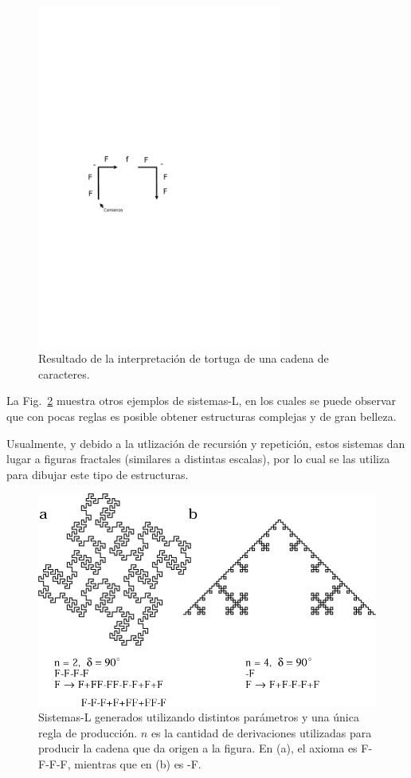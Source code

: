 \begin{figure}
\center
\includegraphics[width=8cm]{figures/tortuga}
\caption{Resultado de la interpretación de tortuga de una cadena de caracteres.}
\label{fg:tortuga}
\end{figure}

La Fig.~\ref{fg:sistemasL} muestra otros ejemplos de sistemas-L, en los cuales se puede observar que con pocas reglas es posible obtener estructuras complejas y de gran belleza.

Usualmente, y debido a la utlización de recursión y repetición, estos sistemas dan lugar a figuras fractales (similares a distintas escalas), por lo cual se las utiliza para dibujar este tipo de estructuras.

\begin{figure}
\center
\includegraphics[width=13cm]{figures/sistemasL}
\caption[Sistemas-L generados utilizando distintos parámetros]{Sistemas-L generados utilizando distintos parámetros y una única regla de producción. $n$ es la cantidad de derivaciones utilizadas para producir la cadena que da origen a la figura. En (a), el axioma es F-F-F-F, mientras que en (b) es -F.}
\label{fg:sistemasL}
\end{figure}

